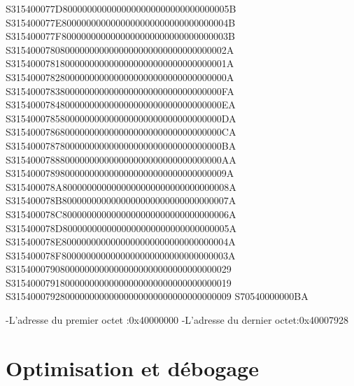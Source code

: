 \documentclass[12pt,a4paper]{article}
\begin{document}
\begin{framed}
{S315400077D8000000000000000000000000000000005B\newline
S315400077E8000000000000000000000000000000004B\newline
S315400077F8000000000000000000000000000000003B\newline
S31540007808000000000000000000000000000000002A\newline
S31540007818000000000000000000000000000000001A\newline
S31540007828000000000000000000000000000000000A\newline
S3154000783800000000000000000000000000000000FA\newline
S3154000784800000000000000000000000000000000EA\newline
S3154000785800000000000000000000000000000000DA\newline
S3154000786800000000000000000000000000000000CA\newline
S3154000787800000000000000000000000000000000BA\newline
S3154000788800000000000000000000000000000000AA\newline
S31540007898000000000000000000000000000000009A\newline
S315400078A8000000000000000000000000000000008A\newline
S315400078B8000000000000000000000000000000007A\newline
S315400078C8000000000000000000000000000000006A\newline
S315400078D8000000000000000000000000000000005A\newline
S315400078E8000000000000000000000000000000004A\newline
S315400078F8000000000000000000000000000000003A\newline
S315400079080000000000000000000000000000000029\newline
S315400079180000000000000000000000000000000019\newline
S315400079280000000000000000000000000000000009\newline
S70540000000BA\newline


}
\end{framed}
\newline
\noindent
-L'adresse du premier octet :0x40000000\newline
-L'adresse du dernier octet:0x40007928
\section{Optimisation et débogage}
\end{document}
